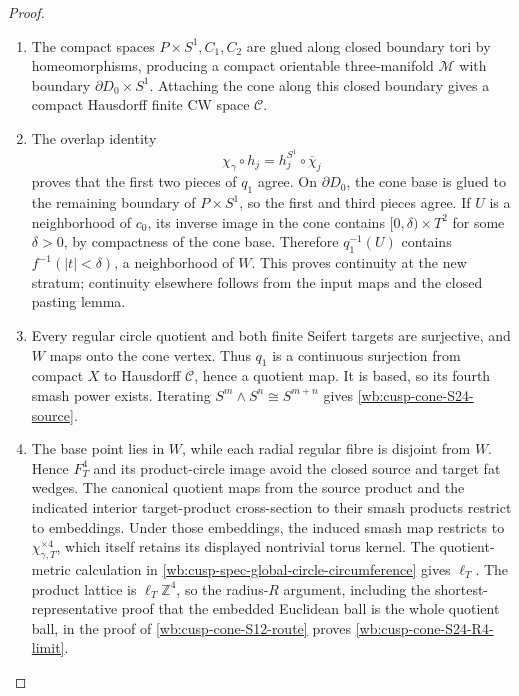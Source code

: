\begin{proof}
\begin{enumerate}[label=\arabic*.,leftmargin=*]
\item The compact spaces \(P\times S^1,C_1,C_2\) are glued along closed boundary
tori by homeomorphisms, producing a compact orientable three-manifold
\(\mathcal M\) with boundary \(\partial D_0\times S^1\).  Attaching the cone
along this closed boundary gives a compact Hausdorff finite CW space
\(\mathcal C\).

\item The overlap identity
\[
 \chi_\gamma\circ h_j=h_j^{S^1}\circ\overline\chi_j
\]
proves that the first two pieces of \(q_1\) agree.  On \(\partial D_0\), the
cone base is glued to the remaining boundary of \(P\times S^1\), so the
first and third pieces agree.  If \(U\) is a neighborhood of \(c_0\), its
inverse image in the cone contains \([0,\delta)\times T^2\) for some
\(\delta>0\), by compactness of the cone base.  Therefore \(q_1^{-1}(U)\)
contains \(f^{-1}(|t|<\delta)\), a neighborhood of \(W\).  This proves
continuity at the new stratum; continuity elsewhere follows from the input
maps and the closed pasting lemma.

\item Every regular circle quotient and both finite Seifert targets are
surjective, and \(W\) maps onto the cone vertex.  Thus \(q_1\) is a
continuous surjection from compact \(X\) to Hausdorff \(\mathcal C\), hence
a quotient map.  It is based, so its fourth smash power exists.  Iterating
\(S^m\wedge S^n\cong S^{m+n}\) gives \cref{wb:cusp-cone-S24-source}.

\item The base point lies in \(W\), while each radial regular fibre is disjoint
from \(W\).  Hence \(F_T^4\) and its product-circle image avoid the closed
source and target fat wedges.  The canonical quotient maps from the source
product and the indicated interior target-product cross-section to their
smash products restrict to embeddings.  Under those embeddings, the induced
smash map restricts to \(\chi_{\gamma,T}^{\times4}\), which itself retains
its displayed nontrivial torus kernel.
The quotient-metric calculation in
\cref{wb:cusp-spec-global-circle-circumference} gives \(\ell_T\).
The product lattice is \(\ell_T\mathbb Z^4\), so the radius-\(R\) argument,
including the shortest-representative proof that the embedded Euclidean ball
is the whole quotient ball, in the proof of \cref{wb:cusp-cone-S12-route} proves
\cref{wb:cusp-cone-S24-R4-limit}.


\end{enumerate}
\end{proof}
